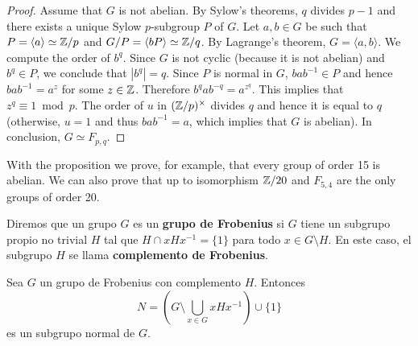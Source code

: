 \begin{proof}
    Assume that $G$ is not abelian. By Sylow's theorems, 
    $q$ divides $p-1$ and there exists 
    a unique Sylow $p$-subgroup $P$ of $G$. Let $a,b\in G$ be such that 
    $P=\langle a\rangle\simeq\mathbb{Z}/p$ and $G/P=\langle bP\rangle\simeq\mathbb{Z}/q$. By Lagrange's theorem, 
    $G=\langle a,b\rangle$. We compute the order of $b^q$. Since 
    $G$ is not cyclic (because it is not abelian) and $b^q\in P$, 
    we conclude that $|b^q|=q$. 
    Since $P$ is normal in $G$, 
    $bab^{-1}\in P$ and hence $bab^{-1}=a^z$ for some $z\in\mathbb{Z}$. Therefore
    $b^qab^{-q}=a^{z^q}$. This implies that 
    $z^q\equiv1\bmod p$. The order of $u$ in $(\mathbb{Z}/p)^{\times}$ divides 
    $q$ and hence it is equal to $q$ (otherwise, $u=1$ and thus $bab^{-1}=a$, which implies
    that $G$ is abelian). In conclusion, 
    $G\simeq F_{p,q}$. 
\end{proof}

With the proposition we prove, for example, that 
every group of order 15 is abelian. We can also prove
that up to isomorphism $\mathbb{Z}/20$ and  
$F_{5,4}$ are the only groups of order 20. 

\begin{definition}
  Diremos que un grupo $G$ es un 
  \textbf{grupo de Frobenius} si $G$ 
  tiene un subgrupo propio no trivial $H$ tal que $H\cap
  xHx^{-1}=\{1\}$ para todo $x\in G\setminus H$. En este caso, el
  subgrupo $H$ se llama \textbf{complemento de Frobenius}.
\end{definition}

\begin{theorem}[Frobenius]
  \label{thm:Frobenius}
  Sea $G$ un grupo de Frobenius con complemento $H$. Entonces
  \[
	N=\left( G\setminus\bigcup_{x\in G}xHx^{-1}\right)\cup\{1\}
  \]
  es un subgrupo normal de $G$.
\end{theorem}

